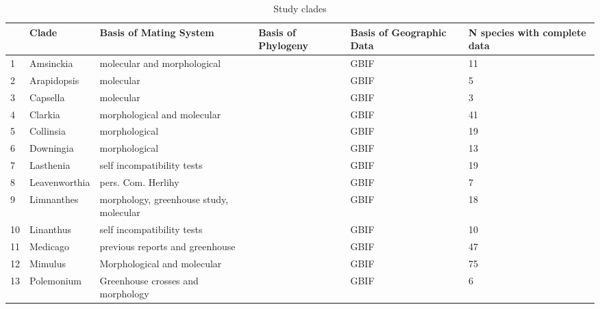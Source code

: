 \documentclass[12pt,letterpaper]{article}
\begin{document}
\begin{table}[ht]
 \caption{Study clades}
\begin{center}
\begin{tabular}{|p{1cm}|p{2.5cm}|p{3cm}|p{3cm}|p{1cm}|p{1cm}|}
  \hline
 & Clade & Basis of Mating System & Basis of Phylogeny & Basis of Geographic Data & N species with complete data \\ 
  \hline
1 & Amsinckia & molecular and morphological &  & GBIF &  11 \\ 
  2 & Arapidopsis & molecular  &  & GBIF &   5 \\ 
  3 & Capsella & molecular  &  & GBIF &   3 \\ 
  4 & Clarkia & morphological and molecular &  & GBIF &  41 \\ 
  5 & Collinsia & morphological &  & GBIF &  19 \\ 
  6 & Downingia & morphological  &  & GBIF &  13 \\ 
  7 & Lasthenia & self incompatibility tests&  & GBIF &  19 \\ 
  8 & Leavenworthia & pers. Com. Herlihy &  & GBIF &   7 \\ 
  9 & Limnanthes & morphology, greenhouse study, molecular  &  & GBIF &  18 \\ 
  10 & Linanthus & self incompatibility tests &  & GBIF &  10 \\ 
  11 & Medicago &  previous reports and greenhouse &  & GBIF &  47 \\ 
  12 & Mimulus & Morphological and molecular &  & GBIF &  75 \\ 
  13 & Polemonium & Greenhouse crosses and morphology &  & GBIF &   6 \\ 
   \hline
\end{tabular}
\end{center}
\end{table}
\end{document}
